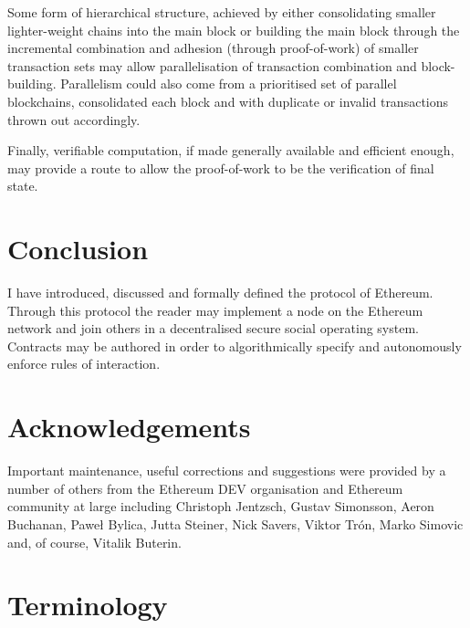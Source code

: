 \documentclass[9pt,oneside]{amsart}
\begin{document}
\begin{multicols}{2}
Some form of hierarchical structure, achieved by either consolidating smaller lighter-weight chains into the main block or building the main block through the incremental combination and adhesion (through proof-of-work) of smaller transaction sets may allow parallelisation of transaction combination and block-building. Parallelism could also come from a prioritised set of parallel blockchains, consolidated each block and with duplicate or invalid transactions thrown out accordingly.

Finally, verifiable computation, if made generally available and efficient enough, may provide a route to allow the proof-of-work to be the verification of final state.

\section{Conclusion} \label{ch:conclusion}

I have introduced, discussed and formally defined the protocol of Ethereum. Through this protocol the reader may implement a node on the Ethereum network and join others in a decentralised secure social operating system. Contracts may be authored in order to algorithmically specify and autonomously enforce rules of interaction.

\section{Acknowledgements}

Important maintenance, useful corrections and suggestions were provided by a number of others from the Ethereum DEV organisation and Ethereum community at large including Christoph Jentzsch, Gustav Simonsson, Aeron Buchanan, Pawe\l{} Bylica, Jutta Steiner, Nick Savers, Viktor Tr\'{o}n, Marko Simovic and, of course, Vitalik Buterin.




\end{multicols}

\appendix

\section{Terminology}
\end{document}
